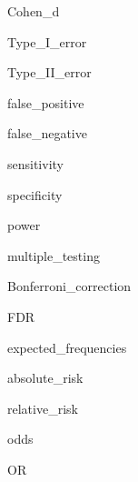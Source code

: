 \documentclass{report}
\begin{document}
\noindent \gls{Cohen_d}

\noindent \gls{Type_I_error}

\noindent \gls{Type_II_error}

\noindent \gls{false_positive}

\noindent \gls{false_negative}

\noindent \gls{sensitivity}

\noindent \gls{specificity}

\noindent \gls{power}

\noindent \gls{multiple_testing}

\noindent \gls{Bonferroni_correction}

\noindent \gls{FDR}

\noindent \gls{expected_frequencies}

\noindent \gls{absolute_risk}

\noindent \gls{relative_risk}

\noindent \gls{odds}

\noindent \gls{OR}
\end{document}
